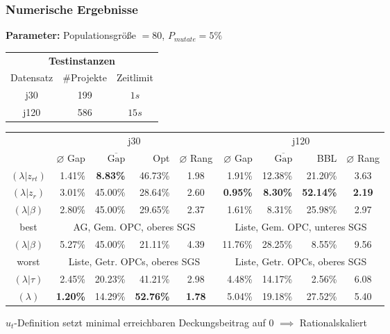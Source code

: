 \begin{frame}[t]
\frametitle{Numerische Ergebnisse}
\begin{footnotesize}
\textbf{Parameter:} Populationsgröße $=80$, $P_{mutate}=5\%$\\

\begin{center}
	\begin{tabular}{ccc}
		\multicolumn{3}{c}{\textbf{Testinstanzen}}\\
		Datensatz & \#Projekte & Zeitlimit\\
		j30 & 199 & $1s$\\
		j120 & 586 & $15s$
	\end{tabular}
\end{center}

\begin{center}	
\tabcolsep=0.16cm
\begin{tabular}{|c|rrrc|rrrc|}
	\hline
	& \multicolumn{4}{c|}{j30} & \multicolumn{4}{c|}{j120}\\
	 & $\varnothing$ Gap & $\overline{\mbox{Gap}}$ & Opt & $\varnothing$ Rang & $\varnothing$ Gap & $\overline{\mbox{Gap}}$ & BBL & $\varnothing$ Rang \\[3pt]
	\hline
   $(\lambda|z_{rt})$&1.41\%&\textbf{8.83\%}&46.73\%&1.98&1.91\%&12.38\%&21.20\%&3.63\\
	\hline
   $(\lambda|z_r)$&3.01\%&45.00\%&28.64\%&2.60&\textbf{0.95\%}&\textbf{8.30\%}&\textbf{52.14\%}&\textbf{2.19}\\
	\hline
	$(\lambda|\beta)$&2.80\%&45.00\%&29.65\%&2.37&1.61\%&8.31\%&25.98\%&2.97\\
	best & \multicolumn{4}{c|}{AG, Gem. OPC, oberes SGS} & \multicolumn{4}{c|}{Liste, Gem. OPC, unteres SGS}\\
	\hline
	$(\lambda|\beta)$&5.27\%&45.00\%&21.11\%&4.39&11.76\%&28.25\%&8.55\%&9.56\\
	worst & \multicolumn{4}{c|}{Liste, Getr. OPCs, oberes SGS} & \multicolumn{4}{c|}{Liste, Getr. OPCs, oberes SGS}\\
	\hline
	$(\lambda|\tau)$&2.45\%&20.23\%&41.21\%&2.98&4.48\%&14.17\%&2.56\%&6.08\\
	\hline
	$(\lambda)$& \textbf{1.20\%}&14.29\%&\textbf{52.76\%}&\textbf{1.78}&5.04\%&19.18\%&27.52\%&5.40\\
	\hline
\end{tabular}
\end{center}

$u_t$-Definition setzt minimal erreichbaren Deckungsbeitrag auf 0 $\implies$ Rationalskaliert

\end{footnotesize}	

\end{frame}

